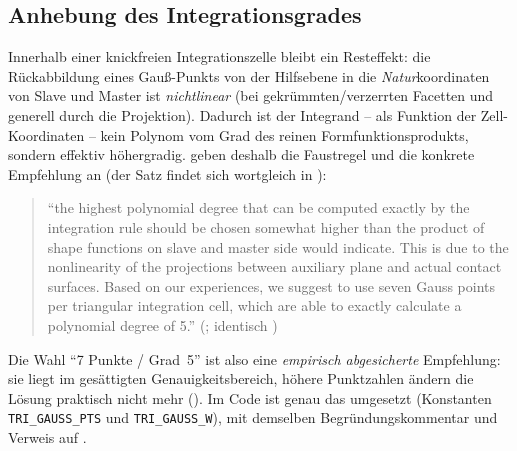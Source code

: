 \documentclass[a4paper,11pt]{article}
\newcommand{\code}[1]{\texttt{\small #1}}
\begin{document}
\subsection{Anhebung des Integrationsgrades}
Innerhalb einer knickfreien Integrationszelle bleibt ein Resteffekt: die Rückabbildung eines
Gauß-Punkts von der Hilfsebene in die \emph{Natur}koordinaten von Slave und Master ist
\emph{nichtlinear} (bei gekrümmten/verzerrten Facetten und generell durch die Projektion). Dadurch
ist der Integrand -- als Funktion der Zell-Koordinaten -- kein Polynom vom Grad des reinen
Formfunktionsprodukts, sondern effektiv höhergradig. \citet{farah2015} geben deshalb die
Faustregel und die konkrete Empfehlung an (der Satz findet sich wortgleich in \citealt[Anh.~A.1.1]{farah}):
\begin{quote}
\small ``the highest polynomial degree that can be computed exactly by the integration rule should
be chosen somewhat higher than the product of shape functions on slave and master side would
indicate. This is due to the nonlinearity of the projections between auxiliary plane and actual
contact surfaces. Based on our experiences, we suggest to use seven Gauss points per triangular
integration cell, which are able to exactly calculate a polynomial degree of 5.''
\hfill (\citealp[S.~217]{farah2015}; identisch \citealp[Anh.~A.1.1, S.~209--210]{farah})
\end{quote}
Die Wahl ``7 Punkte / Grad~5'' ist also eine \emph{empirisch abgesicherte} Empfehlung: sie liegt im
gesättigten Genauigkeitsbereich, höhere Punktzahlen ändern die Lösung praktisch nicht mehr
(\citealp[Kap.~6]{farah}). Im Code ist genau das umgesetzt (Konstanten \code{TRI\_GAUSS\_PTS} und
\code{TRI\_GAUSS\_W}), mit demselben Begründungskommentar und Verweis auf
\citet[Anh.~A.1.1]{farah}.
\end{document}
